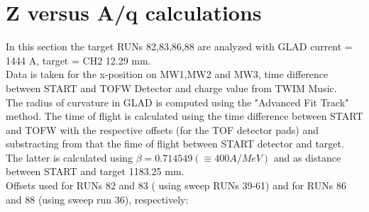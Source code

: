 \documentclass[12pt, letterpaper]{article}
\begin{document}
\section{Z versus A/q calculations}
In this section the target RUNs 82,83,86,88 are analyzed with GLAD current = 1444 A, target = CH2 12.29 mm.\\
Data is taken for the x-position on MW1,MW2 and MW3, time difference between START and TOFW Detector and charge value from TWIM Music.\\
The radius of curvature in GLAD is computed using the "Advanced Fit Track" method. The time of flight is calculated using the time difference between START and TOFW with the respective offsets (for the TOF detector pads) and substracting from that the fime of flight between START detector and target. The latter is calculated using $\beta = 0.714549 (\equiv 400 A/MeV)$ and as distance between START and target  1183.25 mm.\\
\newline
Offsets used for RUNs 82 and 83 ( using sweep RUNs 39-61) and for RUNs 86 and 88 (using sweep run 36), respectively:\\
\end{document}
